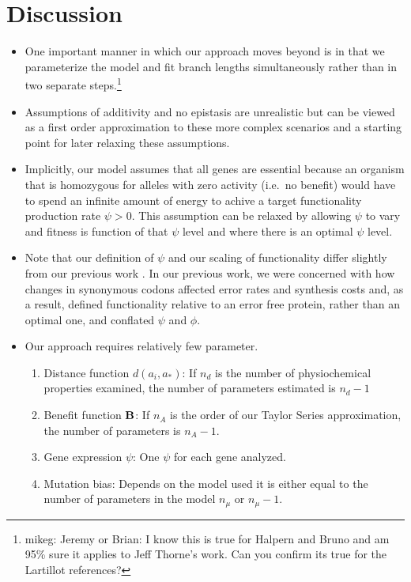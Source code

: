 \documentclass{article}
\newcommand{\Func}{\ensuremath{\text{\textbf{B}}}\xspace}
\newcommand{\aopt}{\ensuremath{a_*}\xspace}
\begin{document}
\section*{Discussion}

\begin{itemize}
\item One important manner in which our approach moves beyond \citet{HalpernAndBruno1998,RobinsonEtAl2003,LartillotAndPhilippe2004,ThorneEtAl2012,RodrigueAndLartillot2014} is in that we parameterize the model and fit branch lengths simultaneously rather than in two separate steps.\footnote{mikeg: Jeremy or Brian: I know this is true for Halpern and Bruno and am 95\% sure it applies to Jeff Thorne's work.
Can you confirm its true for the Lartillot references?}
\item Assumptions of additivity and no epistasis are unrealistic but can be viewed as a first order approximation to these more complex scenarios and a starting point for later relaxing these assumptions.
\item Implicitly, our model assumes that all genes are essential because an organism that is homozygous for alleles with zero activity (i.e.~no benefit) would have to spend an infinite amount of energy to achive a target functionality production rate $\psi > 0$.
This assumption can be relaxed by allowing $\psi$ to vary and fitness is function of that $\psi$ level and where there is an optimal $\psi$ level.
\item Note that our definition of $\psi$ and our scaling of functionality differ slightly from our previous work \citep{Gilchrist2007,GilchristEtAl2009,ShahAndGilchrist2011,GilchristEtAl2015}.
In our previous work, we were concerned with how changes in synonymous codons affected error rates and synthesis costs and, as a result, defined functionality relative to an error free protein, rather than an optimal one, and conflated $\psi$ and $\phi$.
\item Our approach requires relatively few parameter. 
  \begin{enumerate}
  \item Distance function $d(a_i, \aopt)$: If $n_d$ is the number of physiochemical properties examined, the number of parameters estimated is $n_d - 1$
  \item Benefit function $\Func$: If $n_A$ is the order of our Taylor Series approximation, the number of parameters is $n_A-1$.
  \item Gene expression $\psi$: One $\psi$ for each gene analyzed.
  \item Mutation bias: Depends on the model used it is either equal to the number of parameters in the model $n_\mu$ or $n_\mu-1$.

\end{enumerate}
\end{itemize}
\end{document}

